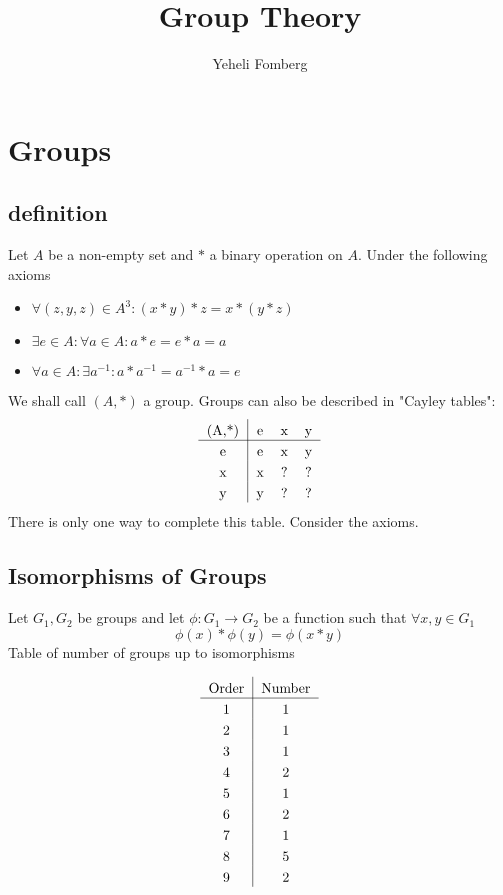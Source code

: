 \documentclass{article}
\title{\textbf{Group Theory}}
\author{Yeheli Fomberg}
\date{}
\begin{document}
	\maketitle
	\newpage
	\section{Groups}
	\subsection{definition}
	Let $A$ be a non-empty set and $*$ a binary operation on $A$. Under the following axioms
	\begin{itemize}
		\item $\forall (z,y,z)\in A^3:(x*y)*z=x*(y*z)$
		\item $\exists e\in A:\forall a\in A:a*e=e*a=a$
		\item $\forall a\in A:\exists a^{-1}:a*a^{-1}=a^{-1}*a=e$
	\end{itemize}
	We shall call $(A,*)$ a group. Groups can also be described in "Cayley tables":
	\[
\setlength\extrarowheight{3pt}
\begin{tabular}{c | c c c}
    (A,*) & e & x & y \\
    \cline{1-4}
    e & e & x & y \\
    x & x & ? & ? \\
    y & y & ? & ? 
\end{tabular}
	\]
	There is only one way to complete this table. Consider the axioms.
	
	\subsection{Isomorphisms of Groups}
	Let $G_1,G_2$ be groups and let $\phi:G_1\to G_2$ be a function such that 
	$\forall x,y\in G_1$
	\[
		\phi(x)*\phi(y) = \phi(x*y)
	\] 
	Table of number of groups up to isomorphisms
	
	\[
\setlength\extrarowheight{3pt}
\begin{tabular}{c | c}
    \text{Order} & \text{Number} \\
    \cline{1-2}
    1 & 1 \\
    2 & 1 \\
    3 & 1 \\
    4 & 2 \\
    5 & 1 \\
    6 & 2 \\
    7 & 1 \\
    8 & 5 \\
    9 & 2
\end{tabular}
	\]
	
\end{document}
